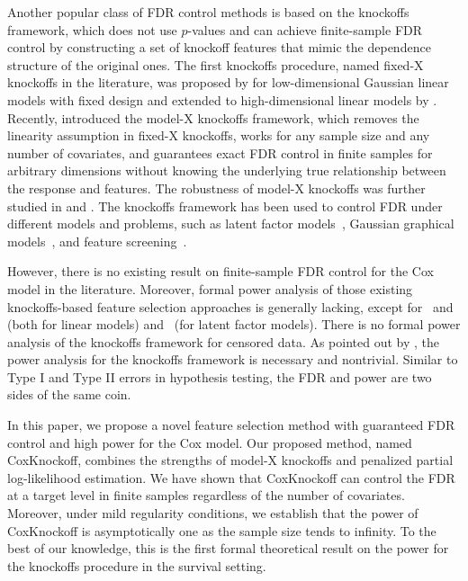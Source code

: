 \documentclass[11pt]{article}
\begin{document}
Another popular class of FDR control methods is based on the knockoffs framework, which does not use $p$-values and can achieve finite-sample FDR control by constructing a set of knockoff features that mimic the dependence structure of the original ones. The first knockoffs procedure, named fixed-X knockoffs in the literature, was proposed by \cite{barber2015controlling} for 
low-dimensional Gaussian linear models with fixed design and extended to high-dimensional linear models by \cite{barber2019knockoff}.
Recently, \cite{candes2018panning} introduced the model-X knockoffs framework, which removes the linearity assumption in fixed-X knockoffs, works for any sample size and any number of covariates,
and guarantees exact FDR control in finite samples for arbitrary dimensions without knowing the underlying true relationship between the response and features. The robustness of 
model-X knockoffs  
was further studied in \cite{barber2020robust} and \cite{fan2020rank}. 
The knockoffs framework has been used to control FDR under 
different  
models and problems, such as latent factor models~\citep{fan2020ipad}, Gaussian graphical models~\citep{zheng2018recovering, li2021ggm, zhou2022reproducible}, and feature screening~\citep{liu2022model}.


However, there is no existing result on finite-sample FDR control for the Cox model in the literature. 
Moreover, 
formal power analysis
of those existing knockoffs-based feature selection approaches is generally lacking, 
except for~\cite{fan2020rank} and~\cite{weinstein2020power} (both for linear models) and~\cite{fan2020ipad} (for latent factor models). There is no formal power analysis
of the knockoffs framework for censored data.
As pointed out by \cite{fan2020rank}, the power analysis for the knockoffs framework is necessary and nontrivial. Similar to Type I and Type II errors in hypothesis testing, the FDR and power are two sides of the same coin.


In this paper, we propose a novel feature selection method with guaranteed FDR control and high power for the Cox model.
Our proposed method, named CoxKnockoff, combines the strengths of model-X knockoffs and penalized partial log-likelihood estimation. We have shown that CoxKnockoff can control the FDR at a target level in finite samples regardless of the number of covariates.
Moreover, under mild regularity conditions, we establish that the power of CoxKnockoff is asymptotically one as the sample size tends to infinity. 
To the best of our knowledge, this is the first formal theoretical result on the power for the knockoffs procedure in the survival setting.
\end{document}
